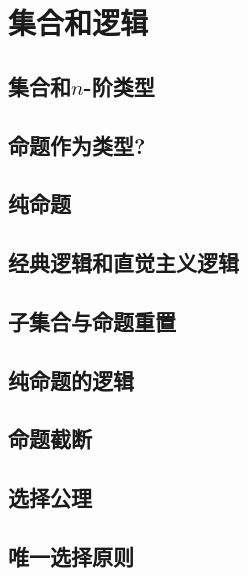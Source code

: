 \chapter{集合和逻辑}
\label{cha:logic}


\section{集合和\texorpdfstring{$n$}{n}-阶类型}
\label{sec:basics-sets}


\section{命题作为类型?}
\label{subsec:pat?}


\section{纯命题}
\label{subsec:hprops}


\section{经典逻辑和直觉主义逻辑}
\label{sec:intuitionism}


\section{子集合与命题重置}
\label{subsec:prop-subsets}


\section{纯命题的逻辑}
\label{subsec:logic-hprop}


\section{命题截断}
\label{subsec:prop-trunc}


\section{选择公理}
\label{sec:axiom-choice}


\section{唯一选择原则}
\label{sec:unique-choice}


